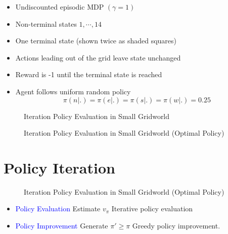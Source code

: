 \documentclass[varwidth]{article}
\begin{document}
\begin{itemize}
    \item Undiscounted episodic MDP $(\gamma = 1)$
    \item Non-terminal states $1, \cdots , 14$
    \item One terminal state (shown twice as shaded squares)
    \item Actions leading out of the grid leave state unchanged
    \item Reward is -1 until the terminal state is reached
    \item Agent follows uniform random policy
    $$\pi(n|.) = \pi(e|.) = \pi(s|.) = \pi(w|.) = 0.25 $$
\end{itemize}
\begin{center}
\begin{figure}[H]
  \centering
  \caption{Iteration Policy Evaluation in Small Gridworld}
  \label{fig:tikz:my}
\end{figure}
\end{center}

\begin{figure}[H]
  \centering
  \caption{Iteration Policy Evaluation in Small Gridworld (Optimal Policy)}
  \label{fig:tikz:my}
\end{figure}

\section{Policy Iteration}
\begin{figure}[H]
  \centering
  \caption{Iteration Policy Evaluation in Small Gridworld (Optimal Policy)}
  \label{fig:tikz:my}
\end{figure}
\begin{itemize}
    \item \textcolor{blue}{Policy Evaluation} Estimate $v_\pi$ Iterative policy evaluation 
    \item \textcolor{blue}{Policy Improvement} Generate $\pi' \geq \pi $ Greedy policy improvement.
\end{itemize}
\end{document}
